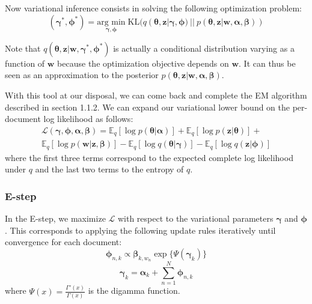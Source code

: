 \documentclass{article}
\begin{document}
Now variational inference consists in solving the following optimization problem:
\begin{equation}
(\bm{\gamma}^*, \bm{\phi}^*) =
\underset{\bm{\gamma}, \bm{\phi}}{\text{arg min}}\;
	\mathrm{KL}(q(\bm{\theta}, \mathbf{z} | \bm{\gamma}, \bm{\phi})~||~p(\bm{\theta}, \mathbf{z} | \mathbf{w}, \bm{\alpha}, \bm{\beta}))
\end{equation}

Note that $q(\bm{\theta}, \mathbf{z} | \mathbf{w}, \bm{\gamma}^*, \bm{\phi}^*)$ is actually a conditional distribution varying as a function of $\mathbf{w}$ because the optimization objective depends on $\mathbf{w}$. It can thus be seen as an approximation to the posterior $p(\bm{\theta}, \mathbf{z} | \mathbf{w}, \bm{\alpha}, \bm{\beta})$.

With this tool at our disposal, we can come back and complete the EM algorithm described in section 1.1.2. We can expand our variational lower bound on the per-document log likelihood as follows:
\begin{multline}
\mathcal{L}(\bm{\gamma}, \bm{\phi},\bm{\alpha}, \bm{\beta}) = 
\mathbb{E}_q [\log p(\bm{\theta} | \bm{\alpha})] + 
\mathbb{E}_q [\log p(\mathbf{z} | \bm{\theta})] + \\
\mathbb{E}_q [\log p(\mathbf{w} | \mathbf{z}, \bm{\beta})] -
\mathbb{E}_q [\log q(\bm{\theta} | \bm{\gamma})] -
\mathbb{E}_q [\log q(\mathbf{z} | \bm{\phi})]
\end{multline}
where the first three terms correspond to the expected complete log likelihood under $q$ and the last two terms to the entropy of $q$.

\subsubsection{E-step}
In the E-step, we maximize $\mathcal{L}$ with respect to the variational parameters $\bm{\gamma}$ and $\bm{\phi}$. This corresponds to applying the following update rules iteratively until convergence for each document:
\begin{equation} 
\label{phi_update}
\bm{\phi}_{n,k} \propto \bm{\beta}_{k, w_n} \exp\{\Psi(\bm{\gamma}_k)\}
\end{equation}
\begin{equation}
\label{gamma_update}
\bm{\gamma}_{k} = \bm{\alpha}_{k} + \sum_{n=1}^N \bm{\phi}_{n,k}
\end{equation}
where $\Psi(x) = \frac{\Gamma'(x)}{\Gamma(x)}$ is the digamma function.
\end{document}
